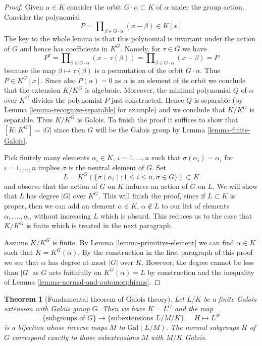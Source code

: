\documentclass{stacks-project}
\theoremstyle{plain}
\newtheorem{theorem}[subsection]{Theorem}
\theoremstyle{definition}
\theoremstyle{remark}
\numberwithin{equation}{subsection}
\begin{document}
\begin{proof}
Given $\alpha \in K$ consider the orbit $G \cdot \alpha \subset K$
of $\alpha$ under the group action. Consider the polynomial
$$
P = \prod\nolimits_{\beta \in G \cdot \alpha} (x - \beta) \in K[x]
$$
The key to the whole lemma is that this polynomial is invariant
under the action of $G$ and hence has coefficients in $K^G$.
Namely, for $\tau \in G$ we have
$$
P^\tau = \prod\nolimits_{\beta \in G \cdot \alpha} (x - \tau(\beta)) =
\prod\nolimits_{\beta \in G \cdot \alpha} (x - \beta) = P
$$
because the map $\beta \mapsto \tau(\beta)$ is a permutation of
the orbit $G \cdot \alpha$. Thus $P \in K^G[x]$. Since also
$P(\alpha) = 0$ as $\alpha$ is an element of its orbit
we conclude that the extension $K/K^G$ is algebraic. Moreover,
the minimal polynomial $Q$ of $\alpha$ over $K^G$ divides the
polynomial $P$ just constructed. Hence $Q$ is separable
(by Lemma \ref{lemma-recognize-separable} for example) and
we conclude that $K/K^G$ is separable. Thus $K/K^G$ is Galois.
To finish the proof it suffices to show that $[K : K^G] = |G|$
since then $G$ will be the Galois group by
Lemma \ref{lemma-finite-Galois}.

\medskip\noindent
Pick finitely many elements $\alpha_i \in K$, $i = 1, \ldots, n$
such that $\sigma(\alpha_i) = \alpha_i$ for $i = 1, \ldots, n$ implies
$\sigma$ is the neutral element of $G$. Set
$$
L = K^G(\{\sigma(\alpha_i); 1 \leq i \leq n, \sigma \in G\}) \subset K
$$
and observe that the action of $G$ on $K$ induces an action of $G$ on $L$.
We will show that $L$ has degree $|G|$ over $K^G$. This will finish the
proof, since if $L \subset K$ is proper, then we can add an element
$\alpha \in K$, $\alpha \not \in L$ to our list of elements
$\alpha_1, \ldots, \alpha_n$ without increasing $L$ which is absurd.
This reduces us to the case that $K/K^G$ is finite which is
treated in the next paragraph.

\medskip\noindent
Assume $K/K^G$ is finite. By Lemma \ref{lemma-primitive-element}
we can find $\alpha \in K$ such that $K = K^G(\alpha)$.
By the construction in the first paragraph of this proof we see
that $\alpha$ has degree at most $|G|$ over $K$. However, the
degree cannot be less than $|G|$ as $G$ acts faithfully on
$K^G(\alpha) = L$ by construction and the inequality of
Lemma \ref{lemma-normal-and-automorphisms}.
\end{proof}

\begin{theorem}[Fundamental theorem of Galois theory]
\label{theorem-galois-theory}
Let $L/K$ be a finite Galois extension with Galois group $G$.
Then we have $K = L^G$ and the map
$$
\{\text{subgroups of }G\}
\longrightarrow
\{\text{subextensions }L/M/K\},\quad
H \longmapsto L^H
$$
is a bijection whose inverse maps $M$ to $\text{Gal}(L/M)$.
The normal subgroups $H$ of $G$ correspond exactly to those
subextensions $M$ with $M/K$ Galois.
\end{theorem}
\end{document}
